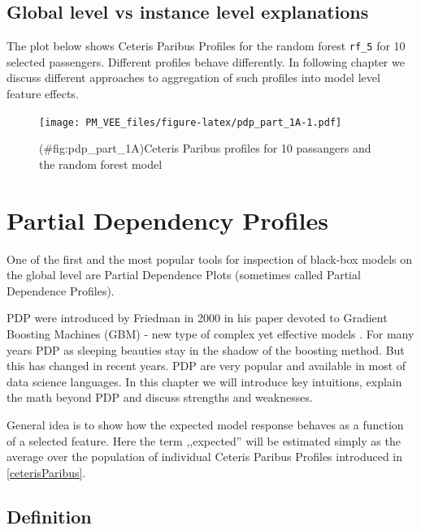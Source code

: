 \documentclass[12pt,]{krantz}
\theoremstyle{definition}
\theoremstyle{definition}
\theoremstyle{definition}
\theoremstyle{remark}
\begin{document}
\hypertarget{global-level-vs-instance-level-explanations}{%
\subsection{Global level vs instance level
explanations}\label{global-level-vs-instance-level-explanations}}

The plot below shows Ceteris Paribus Profiles for the random forest
\texttt{rf\_5} for 10 selected passengers. Different profiles behave
differently. In following chapter we discuss different approaches to
aggregation of such profiles into model level feature effects.

\begin{figure}
\centering
\texttt{[image: PM\_VEE\_files/figure-latex/pdp\_part\_1A-1.pdf]}
\caption{(\#fig:pdp\_part\_1A)Ceteris Paribus profiles for 10 passangers
and the random forest model}
\end{figure}

\hypertarget{partialDependenceProfiles}{%
\section{Partial Dependency Profiles}\label{partialDependenceProfiles}}

One of the first and the most popular tools for inspection of black-box
models on the global level are Partial Dependence Plots (sometimes
called Partial Dependence Profiles).

PDP were introduced by Friedman in 2000 in his paper devoted to Gradient
Boosting Machines (GBM) - new type of complex yet effective models
\citep{Friedman00greedyfunction}. For many years PDP as sleeping
beauties stay in the shadow of the boosting method. But this has changed
in recent years. PDP are very popular and available in most of data
science languages. In this chapter we will introduce key intuitions,
explain the math beyond PDP and discuss strengths and weaknesses.

General idea is to show how the expected model response behaves as a
function of a selected feature. Here the term ,,expected'' will be
estimated simply as the average over the population of individual
Ceteris Paribus Profiles introduced in \ref{ceterisParibus}.

\hypertarget{definition}{%
\subsection{Definition}\label{definition}}
\end{document}
